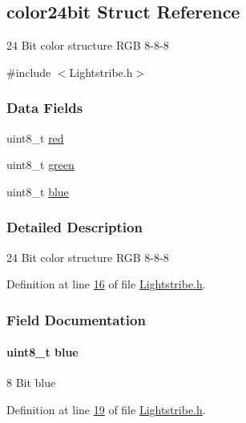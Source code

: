 \hypertarget{structcolor24bit}{}\subsection{color24bit Struct Reference}
\label{structcolor24bit}


24 Bit color structure R\+G\+B 8-\/8-\/8  




{\ttfamily \#include $<$Lightstribe.\+h$>$}

\subsubsection*{Data Fields}
\begin{DoxyCompactItemize}
\item 
uint8\+\_\+t \hyperlink{structcolor24bit_ad47d918910aaa51c73160ac85999d09c}{red}
\item 
uint8\+\_\+t \hyperlink{structcolor24bit_a90d21fa503b626c00cdc8d94863d5877}{green}
\item 
uint8\+\_\+t \hyperlink{structcolor24bit_a287b397e90d7b995c81ff54e741f96b2}{blue}
\end{DoxyCompactItemize}


\subsubsection{Detailed Description}
24 Bit color structure R\+G\+B 8-\/8-\/8 

Definition at line \hyperlink{_lightstribe_8h_source_l00016}{16} of file \hyperlink{_lightstribe_8h_source}{Lightstribe.\+h}.



\subsubsection{Field Documentation}
\hypertarget{structcolor24bit_a287b397e90d7b995c81ff54e741f96b2}{}
\paragraph[{blue}]{\setlength{\rightskip}{0pt plus 5cm}uint8\+\_\+t blue}\label{structcolor24bit_a287b397e90d7b995c81ff54e741f96b2}
8 Bit blue 

Definition at line \hyperlink{_lightstribe_8h_source_l00019}{19} of file \hyperlink{_lightstribe_8h_source}{Lightstribe.\+h}.



